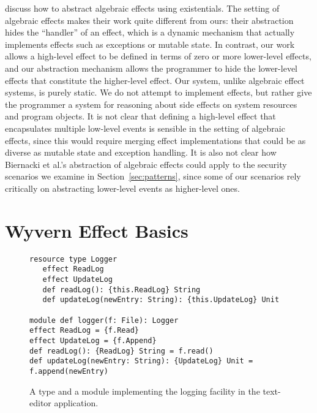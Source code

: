 \citet{biernacki19} discuss how to abstract algebraic effects using existentials. The setting of algebraic effects makes their work quite different from ours: their abstraction hides the ``handler'' of an effect, which is a dynamic mechanism that actually implements effects such as exceptions or mutable state. In contrast, our work allows a high-level effect to be defined in terms of zero or more lower-level effects, and our abstraction mechanism allows the programmer to hide the lower-level effects that constitute the higher-level effect. Our system, unlike algebraic effect systems, is purely static. We do not attempt to implement effects, but rather give the programmer a system for reasoning about side effects on system resources and program objects. It is not clear that defining a high-level effect that encapsulates multiple low-level events is sensible in the setting of algebraic effects, since this would require merging effect implementations that could be as diverse as mutable state and exception handling. It is also not clear how Biernacki et al.'s abstraction of algebraic effects could apply to the security scenarios we examine in Section~\ref{sec:patterns}, since some of our scenarios rely critically on abstracting lower-level events as higher-level ones.

\section{Wyvern Effect Basics}
\label{sec:wyvern-effects-basics}

\begin{figure}[t]
\begin{lstlisting}
resource type Logger
   effect ReadLog
   effect UpdateLog
   def readLog(): {this.ReadLog} String
   def updateLog(newEntry: String): {this.UpdateLog} Unit

module def logger(f: File): Logger
effect ReadLog = {f.Read}
effect UpdateLog = {f.Append}
def readLog(): {ReadLog} String = f.read()
def updateLog(newEntry: String): {UpdateLog} Unit = f.append(newEntry)
\end{lstlisting}
\caption{A type and a module implementing the logging facility in the text-editor application.}
\label{f-logger}
\end{figure}

